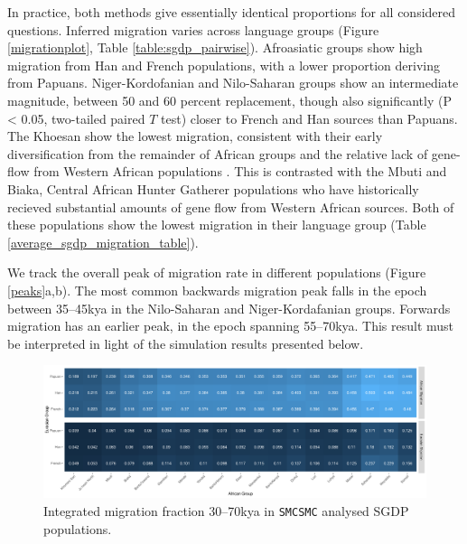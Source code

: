 \documentclass{article}
\begin{document}
In practice, both methods give essentially identical proportions for all considered questions. Inferred migration varies across language groups (Figure \ref{migrationplot}, Table \ref{table:sgdp_pairwise}). Afroasiatic groups show high migration from Han and French populations, with a lower proportion deriving from Papuans. Niger-Kordofanian and Nilo-Saharan groups show an intermediate magnitude, between 50 and 60 percent replacement, though also significantly (P < 0.05, two-tailed paired $T$ test) closer to French and Han sources than Papuans. The Khoesan show the lowest migration, consistent with their early diversification from the remainder of African groups and the relative lack of gene-flow from Western African populations \cite{Lipson2019}. This is contrasted with the Mbuti and Biaka, Central African Hunter Gatherer populations who have historically recieved substantial amounts of gene flow from Western African sources. Both of these populations show the lowest migration in their language group (Table \ref{average_sgdp_migration_table}). 

We track the overall peak of migration rate in different populations (Figure \ref{peaks}a,b). The most common backwards migration peak falls in the epoch between 35--45kya in the Nilo-Saharan and Niger-Kordafanian groups. Forwards migration has an earlier peak, in the epoch spanning 55--70kya. This result must be interpreted in light of the simulation results presented below.  



\begin{figure}
	\centering
	\includegraphics[width=\textwidth]{plot/integrated_sgdp.pdf}
	\caption{Integrated migration fraction 30--70kya in {\tt SMCSMC} analysed SGDP populations.}
	\label{sgdp_heatmap}
\end{figure}
\end{document}
